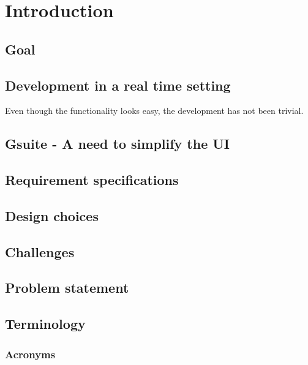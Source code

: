\documentclass[english]{article}
\title{}
\author{Johannes Akse}
\begin{document}
\maketitle{}
\tableofcontents
\nocite{*}

\section{Introduction}

\subsection{Goal}

\subsection{Development in a real time setting}
Even though the functionality looks easy, the development has not been trivial. 

\subsection{Gsuite - A need to simplify the UI}

\subsection{Requirement specifications}

\subsection{Design choices}

\subsection{Challenges}

\subsection{Problem statement}

\subsection{Terminology}
\subsubsection{Acronyms}
\end{document}
